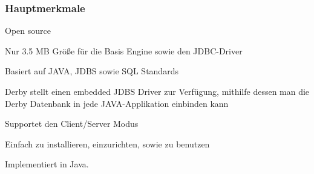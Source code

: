 \subsubsection{Hauptmerkmale}

\begin{compactitem}
    \item Open source
    \item Nur 3.5 MB Größe für die Basis Engine sowie den JDBC-Driver         
    \item Basiert auf JAVA, JDBS sowie SQL Standards
    \item Derby stellt einen embedded JDBS Driver zur Verfügung, mithilfe dessen man die Derby Datenbank in jede JAVA-Applikation einbinden kann
    \item Supportet den Client/Server Modus 
    \item Einfach zu installieren, einzurichten, sowie zu benutzen
\end{compactitem}

Implementiert in Java. 